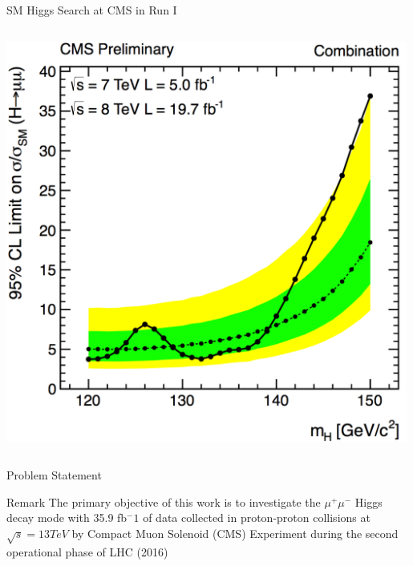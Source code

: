 \documentclass[pdf, 9pt]{beamer}
\begin{document}
\begin{frame}{SM Higgs Search at CMS in Run I}
\begin{columns}[T]
\begin{column}{0.3\textwidth}
        \includegraphics[width=0.99\textwidth, height=0.28\textheight]{figs/higgs/run1/HIGpas_limit_Combination.png}
      \end{column}
    \end{columns}
  \end{frame}

  \begin{frame}{Problem Statement}
    \begin{block}{Remark}
      The primary objective of this work is to investigate the $\mu^{+} \mu^{-}$ Higgs decay mode with 35.9 fb$^-1$ of data collected in proton-proton collisions at $\sqrt{s}=13 TeV$ by Compact Muon Solenoid (CMS) Experiment during the second operational phase of LHC (2016)
    \end{block}
  \end{frame}
\end{document}
